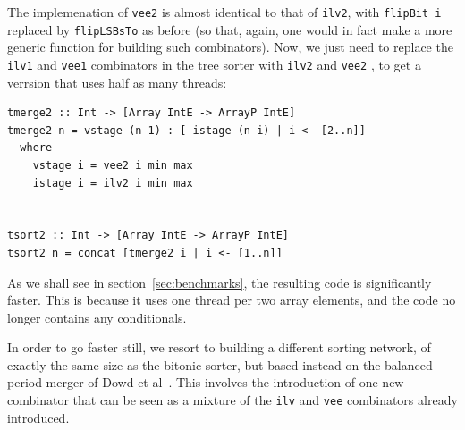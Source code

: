 \documentclass[]{sigplanconf}
\begin{document}
The implemenation of {\tt vee2} is almost identical to
that of {\tt ilv2}, with {\tt flipBit i}
replaced by {\tt flipLSBsTo} as before (so that, again, one would in
fact make a more generic function for building such combinators).
Now, we just need to replace the {\tt ilv1} and {\tt vee1} combinators
in the tree sorter with {\tt ilv2} and {\tt vee2} , to get a verrsion that uses half as many threads:
\begin{codesize}
\begin{verbatim}
tmerge2 :: Int -> [Array IntE -> ArrayP IntE]
tmerge2 n = vstage (n-1) : [ istage (n-i) | i <- [2..n]]
  where
    vstage i = vee2 i min max
    istage i = ilv2 i min max


tsort2 :: Int -> [Array IntE -> ArrayP IntE]
tsort2 n = concat [tmerge2 i | i <- [1..n]]
\end{verbatim}
\end{codesize}
As we shall see in section~\ref{sec:benchmarks}, the resulting code
is significantly faster. This is because it uses one thread per two array elements,
and the code no longer contains any conditionals.

In order to go faster still, we resort to building a different sorting network, of
exactly the same size as the bitonic sorter, but based instead on the balanced period merger of Dowd et al~\cite{PeriodicBalanced}.
This involves the introduction of one new combinator that can be seen as a mixture
of the {\tt ilv} and {\tt vee} combinators already introduced.
\end{document}

